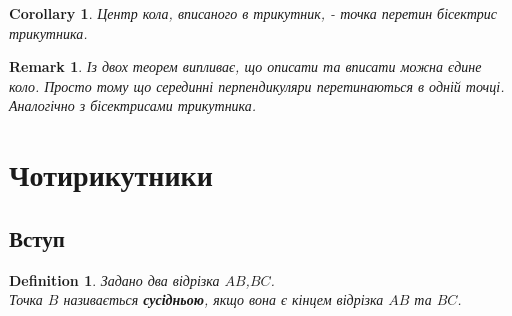 \documentclass[a4paper, 10pt]{article}
\theoremstyle{theoremdd}
\theoremstyle{theoremdd}
\theoremstyle{theoremdd}
\newtheorem{definition}[theorem]{Definition}
\theoremstyle{theoremdd}
\theoremstyle{theoremdd}
\theoremstyle{theoremdd}
\theoremstyle{theoremdd}
\newtheorem{remark}[theorem]{Remark}
\theoremstyle{theoremdd}
\theoremstyle{theoremdd}
\newtheorem{corollary}[theorem]{Corollary}
\begin{document}
\begin{corollary}
Центр кола, вписаного в трикутник, - точка перетин бісектрис трикутника.
\end{corollary}

\begin{remark}
Із двох теорем випливає, що описати та вписати можна єдине коло. Просто тому що серединні перпендикуляри перетинаються в одній точці. Аналогічно з бісектрисами трикутника.
\end{remark}

\newpage

\section{Чотирикутники}
\subsection{Вступ}
\begin{definition}
Задано два відрізка $AB$,$BC$.\\
Точка $B$ називається \textbf{сусідньою}, якщо вона є кінцем відрізка $AB$ та $BC$.
\begin{figure}[H]
\centering
{}
\end{figure}
\end{definition}
\end{document}

